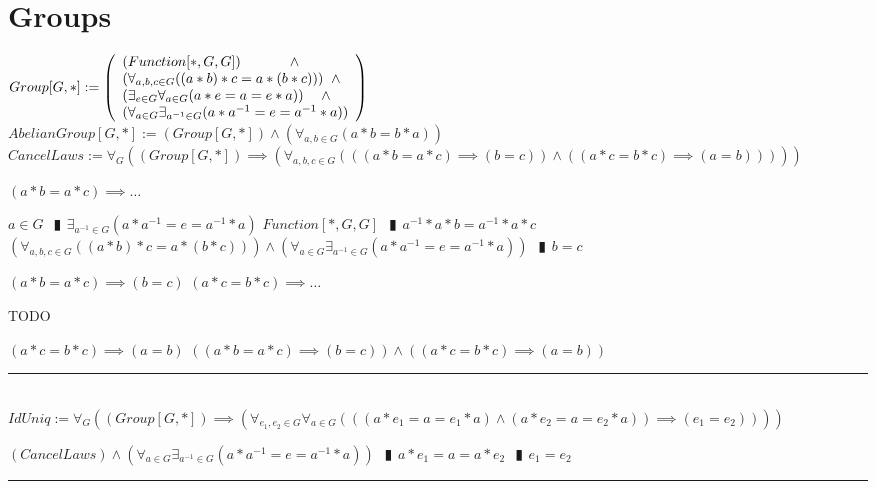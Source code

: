 \documentclass{book}
\newcommand{\abr}{:=}
\newcommand{\pipe}{$\phantom{(}\vrectangleblack\phantom{)}$}
\begin{document}
\section{Groups}
$Group[G, *] \abr \left(\begin{array}{ll}
  (Function[*, G, G]) \hfill \land \hfill \\  %
  (\forall_{a, b, c \in G}((a * b) * c = a * (b * c))) \hfill \land \hfill \\  %
  (\exists_{e \in G} \forall_{a \in G}(a * e = a = e * a)) \hfill \land \hfill \\  %
  (\forall_{a \in G} \exists_{a^{-1} \in G}(a * a^{-1} = e = a^{-1} * a))
\end{array}\right)$ \\
$AbelianGroup[G, *] \abr (Group[G, *]) \land (\forall_{a, b \in G}(a * b = b * a))$ \\

$CancelLaws \abr \forall_{G}((Group[G, *]) \implies (\forall_{a, b, c \in G}(((a * b = a * c) \implies (b = c)) \land ((a * c = b * c) \implies (a = b)))))$
\begin{enumerate}
  \lit $(a * b = a * c) \implies \ldots$
  \begin{enumerate}
    \lit $a \in G$ \pipe $\exists_{a^{-1} \in G}(a * a^{-1} = e = a^{-1} * a)$
    \lit $Function[*, G, G]$ \pipe $a^{-1} * a * b = a^{-1} * a * c$
    \lit $(\forall_{a, b, c \in G}((a * b) * c = a * (b * c))) \land (\forall_{a \in G} \exists_{a^{-1} \in G}(a * a^{-1} = e = a^{-1} * a))$ \pipe $b = c$
  \end{enumerate}
  \lit $(a * b = a * c) \implies (b = c)$
  \lit $(a * c = b * c) \implies \ldots$
  \begin{enumerate}
    \lit TODO
  \end{enumerate}
  \lit $(a * c = b * c) \implies (a = b)$
  \lit $((a * b = a * c) \implies (b = c)) \land ((a * c = b * c) \implies (a = b))$
\end{enumerate} \vspace{.75mm} \hrule \vspace{.75mm} \ \\ 

$IdUniq \abr \forall_{G}((Group[G, *]) \implies (\forall_{e_1, e_2 \in G} \forall_{a \in G}(((a * e_1 = a = e_1 * a) \land (a * e_2 = a = e_2 * a)) \implies (e_1 = e_2))))$
\begin{enumerate}
  \lit $(CancelLaws) \land (\forall_{a \in G} \exists_{a^{-1} \in G}(a * a^{-1} = e = a^{-1} * a))$ \pipe $a * e_1 = a = a * e_2$ \pipe $e_1 = e_2$
\end{enumerate} \vspace{.75mm} \hrule \vspace{.75mm} \ \\ 
\end{document}
